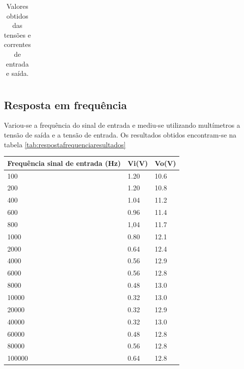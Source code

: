\documentclass[%
  reprint,
  nofootinbib,
  amsmath,amssymb,
  aps,
  10pt,
  a4paper
]{revtex4-1}
\begin{document}
{\begin{table}[h]
\begin{tabular}{|l|l|}
    \end{tabular}
    \caption{Valores obtidos das tensões e correntes de entrada e saída.}
    \label{tab:impedancia}
\end{table}





\subsection{Resposta em frequência}
Variou-se a frequência do sinal de entrada e mediu-se utilizando multímetros a tensão de saída e a tensão de entrada. Os resultados obtidos encontram-se na tabela \ref{tab:respostafrequenciaresultados}
\begin{table}[h]
    \begin{tabular}{|l|l|l|}
    \hline
    Frequência sinal de entrada (Hz) & Vi(V) & Vo(V) \\ \hline
    100                              & 1.20  & 10.6  \\ \hline
    200                              & 1.20  & 10.8  \\ \hline
    400                              & 1.04  & 11.2  \\ \hline
    600                              & 0.96  & 11.4  \\ \hline
    800                              & 1,04  & 11.7  \\ \hline
    1000                             & 0.80  & 12.1  \\ \hline
    2000                             & 0.64  & 12.4  \\ \hline
    4000                             & 0.56  & 12.9  \\ \hline
    6000                             & 0.56  & 12.8  \\ \hline
    8000                             & 0.48  & 13.0  \\ \hline
    10000                            & 0.32  & 13.0  \\ \hline
    20000                            & 0.32  & 12.9  \\ \hline
    40000                            & 0.32  & 13.0  \\ \hline
    60000                            & 0.48  & 12.8  \\ \hline
    80000                            & 0.56  & 12.8  \\ \hline
    100000                           & 0.64  & 12.8  \\ \hline

\end{tabular}
\end{table}}
\end{document}

